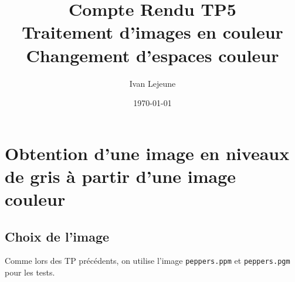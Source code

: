 \documentclass[french,a4paper,10pt]{article}
\title{Compte Rendu TP5\\
Traitement d'images en couleur\\
Changement d'espaces couleur}
\author{Ivan Lejeune}
\date{\today}
\begin{document}
    \maketitle

    \tableofcontents

    \newpage
    \section{Obtention d'une image en niveaux de gris à partir d'une image couleur}\label{sec:1}

    \subsection{Choix de l'image}\label{subsec:1.1}

    Comme lors des TP précédents, on utilise l'image \texttt{peppers.ppm} et
    \texttt{peppers.pgm} pour les tests.
\end{document}
